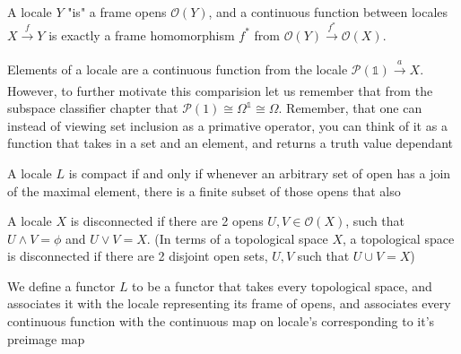 \begin{definition}
    A locale $Y$ "is" a frame opens $\mathcal{O}(Y)$, and a continuous function between locales $X \xrightarrow[]{f} Y$ is exactly a frame homomorphism $f^*$ from $\mathcal{O}(Y) \xrightarrow[]{f^*} \mathcal{O}(X)$.
\end{definition}
\begin{definition}
    Elements of a locale are a continuous function from the locale $\mathcal{P}(\mathbb{1}) \xrightarrow[]{a} X$. However, to further motivate this comparision let us remember that from the subspace classifier chapter that $\mathcal{P}(1) \cong \Omega^\mathbb{1} \cong \Omega$. Remember, that one can instead of viewing set inclusion as a primative operator, you can think of it as a function that takes in a set and an element, and returns a truth value dependant 
\end{definition}
\begin{definition}
    A locale $L$ is compact if and only if whenever an arbitrary set of open has a join of the maximal element, there is a finite subset of those opens that also 
\end{definition}
\begin{definition}
    A locale $X$ is disconnected if there are 2 opens  $U,V \in \mathcal{O}(X)$, such that $U \wedge V = \phi$ and $U \vee V = X$. (In terms of a topological space $X$, a topological space is disconnected if there are 2 disjoint open sets, $U,V$ such that $U \cup V = X$)
\end{definition}


\begin{definition}[$L$-Functor]
    We define a functor $L$ to be a functor that takes every topological space, and associates it with the locale representing its frame of opens, and associates every continuous function with the continuous map on locale's corresponding to it's preimage map
\end{definition}

\begin{definition}
    
\end{definition}



